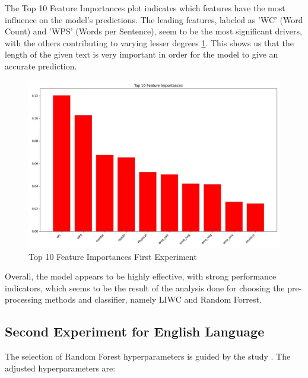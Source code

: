 The Top 10 Feature Importances plot indicates which features have the most influence on the model's predictions. The leading features, labeled as 'WC' (Word Count) and 'WPS' (Words per Sentence), seem to be the most significant drivers, with the others contributing to varying lesser degrees \ref{top10FeaturesFirstExperiment}. This shows us that the length of the given text is very important in order for the model to give an accurate prediction.

\begin{figure}[htbp]
	\centering
		\includegraphics[scale=0.5]{LaTeX Bachelor Thesis Depression Signs Detection/figures/metrics/experiment1English/top10features.jpg}
	\caption{Top 10 Feature Importances First Experiment}
	\label{top10FeaturesFirstExperiment}
\end{figure}

Overall, the model appears to be highly effective, with strong performance indicators, which seems to be the result of the analysis done for choosing the pre-processing methods and classifier, namely LIWC \cite{boyd2022development} and Random Forrest.

\subsection{Second Experiment for English Language}
The selection of Random Forest hyperparameters is guided by the study \cite{probst2019hyperparameters}. The adjusted hyperparameters are:

